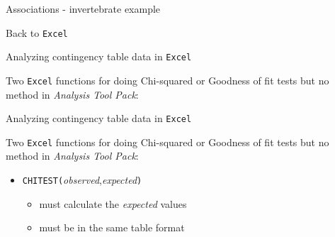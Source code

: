 \documentclass[
  ignorenonframetext,
  t]{beamer}
\providecommand{\tightlist}{%
  \setlength{\itemsep}{0pt}\setlength{\parskip}{0pt}}
\begin{document}
\begin{frame}{Associations - invertebrate example}
\protect\hypertarget{associations---invertebrate-example-9}{}

\vfill
\centering
\Large

Back to \texttt{Excel}

\vfill

\end{frame}

\begin{frame}[fragile]{Analyzing contingency table data in
\texttt{Excel}}
\protect\hypertarget{analyzing-contingency-table-data-in}{}

Two \texttt{Excel} functions for doing Chi-squared or Goodness of fit
tests but no method in \emph{Analysis Tool Pack}:

\end{frame}

\begin{frame}[fragile]{Analyzing contingency table data in
\texttt{Excel}}
\protect\hypertarget{analyzing-contingency-table-data-in-1}{}

Two \texttt{Excel} functions for doing Chi-squared or Goodness of fit
tests but no method in \emph{Analysis Tool Pack}:

\begin{itemize}
\tightlist
\item
  \texttt{CHITEST(}\emph{observed},\emph{expected}\texttt{)}

  \begin{itemize}
  \tightlist
  \item
    must calculate the \emph{expected} values
  \item
    must be in the same table format
  \end{itemize}
\end{itemize}

\end{frame}
\end{document}
